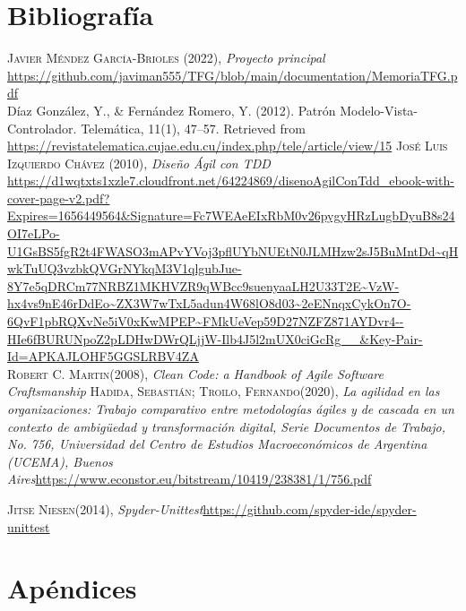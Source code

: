 \documentclass[12pt,a4paper]{article}
\begin{document}
	\section{Bibliografía}
	 \renewcommand\refname{}
\begin{thebibliography}{X}


 \textsc{Javier Méndez García-Brioles} \textsc{(2022)},
\textit{Proyecto principal} \url{https://github.com/javiman555/TFG/blob/main/documentation/MemoriaTFG.pdf}\\


Díaz González, Y., \& Fernández Romero, Y. (2012). Patrón Modelo-Vista-Controlador. Telemática, 11(1), 47–57. Retrieved from \url{https://revistatelematica.cujae.edu.cu/index.php/tele/article/view/15}
\textsc{José Luis Izquierdo Chávez} \textsc{(2010)},
\textit{Diseño Ágil con TDD} \url{https://d1wqtxts1xzle7.cloudfront.net/64224869/disenoAgilConTdd_ebook-with-cover-page-v2.pdf?Expires=1656449564&Signature=Fc7WEAeEIxRbM0v26pygyHRzLugbDyuB8s24OI7eLPo-U1GsBS5fgR2t4FWASO3mAPvYVoj3pflUYbNUEtN0JLMHzw2sJ5BuMntDd~qHwkTuUQ3vzbkQVGrNYkqM3V1qlgubJue-8Y7e5qDRCm77NRBZ1MKHVZR9qWBcc9suenyaaLH2U33T2E~VzW-hx4vs9nE46rDdEo~ZX3W7wTxL5adun4W68lO8d03~2eENnqxCykOn7O-6QvF1pbRQXvNe5iV0xKwMPEP~FMkUeVep59D27NZFZ871AYDvr4--HIe6fBURUNpoZ2pLDHwDWrQLjjW-Ilb4J5l2mUX0ciGcRg__&Key-Pair-Id=APKAJLOHF5GGSLRBV4ZA}\\

 \textsc{Robert C. Martin}\textsc{(2008)},
\textit{Clean Code: a Handbook of Agile Software Craftsmanship
}
 \textsc{Hadida, Sebastián; Troilo, Fernando}\textsc{(2020)},
\textit{La agilidad en las
organizaciones: Trabajo comparativo entre metodologías ágiles y de cascada en un contexto de
ambigüedad y transformación digital, Serie Documentos de Trabajo, No. 756, Universidad del
Centro de Estudios Macroeconómicos de Argentina (UCEMA), Buenos Aires}\url{https://www.econstor.eu/bitstream/10419/238381/1/756.pdf}

 \textsc{Jitse Niesen}\textsc{(2014)},
\textit{Spyder-Unittest}\url{https://github.com/spyder-ide/spyder-unittest}

\end{thebibliography}
\pagebreak

\section{Apéndices}
\end{document}
